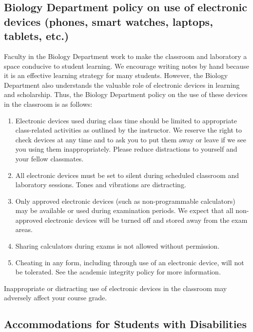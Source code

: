 \documentclass{tufte-handout}
\begin{document}
\begin{fullwidth}

\subsection{Biology Department policy on use of electronic devices (phones, smart watches, laptops, tablets, etc.)}

Faculty in the Biology Department work to make the classroom and laboratory a space conducive to student learning. We encourage writing notes by hand because it is an effective learning strategy for many students. However, the Biology Department also understands the valuable role of electronic devices in learning and scholarship. Thus, the Biology Department policy on the use of these devices in the classroom is as follows:


\begin{enumerate}
\item Electronic devices used during class time should be limited to appropriate class-related activities as outlined by the instructor. We reserve the right to check devices at any time and to ask you to put them away or leave if we see you using them inappropriately. Please reduce distractions to yourself and your fellow classmates.
\item All electronic devices must be set to silent during scheduled classroom and laboratory sessions. Tones and vibrations are distracting.
\item Only approved electronic devices (such as non-programmable calculators) may be available or used during examination periods. We expect that all non-approved electronic devices will be turned off and stored away from the exam areas.
\item Sharing calculators during exams is not allowed without permission. 
\item Cheating in any form, including through use of an electronic device, will not be tolerated. See the academic integrity policy for more information.
\end{enumerate}

Inappropriate or distracting use of electronic devices in the classroom may adversely affect your course grade. 

\subsection{Accommodations for Students with Disabilities}


\end{fullwidth}
\end{document}
